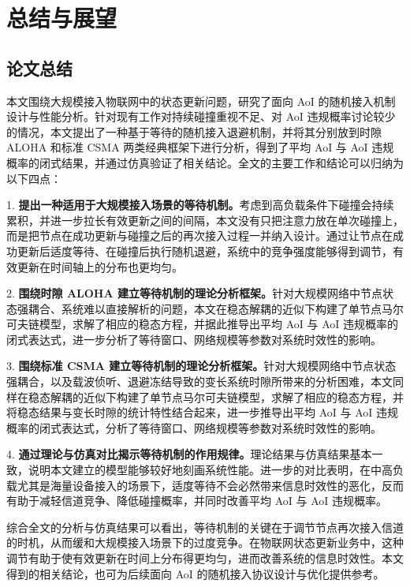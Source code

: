 \clearpage

\vspace*{-1\baselineskip}
\section{总结与展望}
\vspace{6pt}

\subsection{论文总结}

本文围绕大规模接入物联网中的状态更新问题，研究了面向 AoI 的随机接入机制设计与性能分析。针对现有工作对持续碰撞重视不足、对 AoI 违规概率讨论较少的情况，本文提出了一种基于等待的随机接入退避机制，并将其分别放到时隙 ALOHA 和标准 CSMA 两类经典框架下进行分析，得到了平均 AoI 与 AoI 违规概率的闭式结果，并通过仿真验证了相关结论。全文的主要工作和结论可以归纳为以下四点：

1. \textbf{提出一种适用于大规模接入场景的等待机制。}考虑到高负载条件下碰撞会持续累积，并进一步拉长有效更新之间的间隔，本文没有只把注意力放在单次碰撞上，而是把节点在成功更新与碰撞之后的再次接入过程一并纳入设计。通过让节点在成功更新后适度等待、在碰撞后执行随机退避，系统中的竞争强度能够得到调节，有效更新在时间轴上的分布也更均匀。

2. \textbf{围绕时隙 ALOHA 建立等待机制的理论分析框架。}针对大规模网络中节点状态强耦合、系统难以直接解析的问题，本文在稳态解耦的近似下构建了单节点马尔可夫链模型，求解了相应的稳态方程，并据此推导出平均 AoI 与 AoI 违规概率的闭式表达式，进一步分析了等待窗口、网络规模等参数对系统时效性的影响。

3. \textbf{围绕标准 CSMA 建立等待机制的理论分析框架。}针对大规模网络中节点状态强耦合，以及载波侦听、退避冻结导致的变长系统时隙所带来的分析困难，本文同样在稳态解耦的近似下构建了单节点马尔可夫链模型，求解了相应的稳态方程，并将稳态结果与变长时隙的统计特性结合起来，进一步推导出平均 AoI 与 AoI 违规概率的闭式表达式，分析了等待窗口、网络规模等参数对系统时效性的影响。

4. \textbf{通过理论与仿真对比揭示等待机制的作用规律。}理论结果与仿真结果基本一致，说明本文建立的模型能够较好地刻画系统性能。进一步的对比表明，在中高负载尤其是海量设备接入的场景下，适度等待不会必然带来信息时效性的恶化，反而有助于减轻信道竞争、降低碰撞概率，并同时改善平均 AoI 与 AoI 违规概率。

综合全文的分析与仿真结果可以看出，等待机制的关键在于调节节点再次接入信道的时机，从而缓和大规模接入场景下的过度竞争。在物联网状态更新业务中，这种调节有助于使有效更新在时间上分布得更均匀，进而改善系统的信息时效性。本文得到的相关结论，也可为后续面向 AoI 的随机接入协议设计与优化提供参考。

